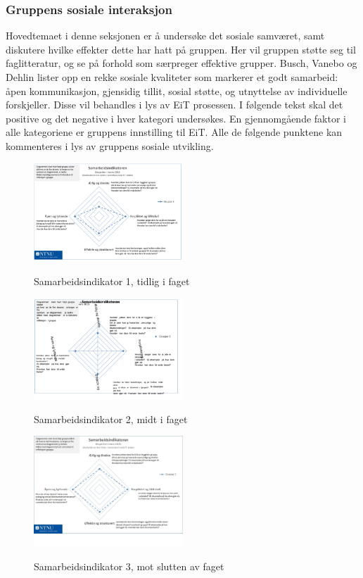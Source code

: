 \subsubsection{Gruppens sosiale interaksjon}

Hovedtemaet i denne seksjonen er å undersøke det sosiale samværet, samt diskutere hvilke effekter dette har hatt på gruppen.
Her vil gruppen støtte seg til faglitteratur\cite{orgorg}, og se på forhold som særpreger effektive grupper. 
Busch, Vanebo og Dehlin\cite[p.~257]{orgorg} lister opp en rekke sosiale kvaliteter som markerer et godt samarbeid: åpen kommunikasjon, gjensidig tillit, sosial støtte, og utnyttelse av individuelle forskjeller.
Disse vil behandles i lys av EiT prosessen.
I følgende tekst skal det positive og det negative i hver kategori undersøkes.
En gjennomgående faktor i alle kategoriene er gruppens innstilling til EiT. 
Alle de følgende punktene kan kommenteres i lys av gruppens sosiale utvikling. 

\begin{figure}[h!]
  \caption{Samarbeidsindikator 1, tidlig i faget}
  \centering
    \includegraphics[width=0.5\textwidth]{Bilder/samarbeidsindikator1.png}\label{samarbeidsindikator1}

\end{figure}
\begin{figure}[h!]
  \caption{Samarbeidsindikator 2, midt i faget}
  \centering
    \includegraphics[width=0.5\textwidth]{Bilder/samarbeidsindikator_2.png}\label{samarbeidsindikator2}
\end{figure}

\begin{figure}[h!]
  \caption{Samarbeidsindikator 3, mot slutten av faget}
  \centering
    \includegraphics[width=0.5\textwidth]{Bilder/samarbeidsindikator_3.jpg}\label{samarbeidsindikator3}
\end{figure}

